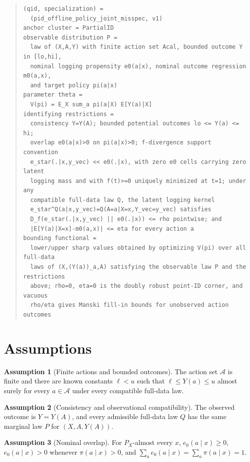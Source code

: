 \documentclass[11pt]{article}
\theoremstyle{definition}
\newtheorem{assumption}{Assumption}
\theoremstyle{plain}
\theoremstyle{remark}
\begin{document}
\begin{quote}\small
\begin{verbatim}
(qid, specialization) =
  (pid_offline_policy_joint_misspec, v1)
anchor cluster = PartialID
observable distribution P =
  law of (X,A,Y) with finite action set Acal, bounded outcome Y in [lo,hi],
  nominal logging propensity e0(a|x), nominal outcome regression m0(a,x),
  and target policy pi(a|x)
parameter theta =
  V(pi) = E_X sum_a pi(a|X) E[Y(a)|X]
identifying restrictions =
  consistency Y=Y(A); bounded potential outcomes lo <= Y(a) <= hi;
  overlap e0(a|x)>0 on pi(a|x)>0; f-divergence support convention
  e_star(.|x,y_vec) << e0(.|x), with zero e0 cells carrying zero latent
  logging mass and with f(t)>=0 uniquely minimized at t=1; under any
  compatible full-data law Q, the latent logging kernel
  e_star^Q(a|x,y_vec)=Q(A=a|X=x,Y_vec=y_vec) satisfies
  D_f(e_star(.|x,y_vec) || e0(.|x)) <= rho pointwise; and
  |E[Y(a)|X=x]-m0(a,x)| <= eta for every action a
bounding functional =
  lower/upper sharp values obtained by optimizing V(pi) over all full-data
  laws of (X,(Y(a))_a,A) satisfying the observable law P and the restrictions
  above; rho=0, eta=0 is the doubly robust point-ID corner, and vacuous
  rho/eta gives Manski fill-in bounds for unobserved action outcomes
\end{verbatim}
\end{quote}

\section{Assumptions}
\begin{assumption}[Finite actions and bounded outcomes]\label{ass:bounded}
The action set $\mathcal{A}$ is finite and there are known constants $\ell<u$ such that $\ell\le Y(a)\le u$ almost surely for every $a\in\mathcal{A}$ under every compatible full-data law.
\end{assumption}

\begin{assumption}[Consistency and observational compatibility]\label{ass:compat}
The observed outcome is $Y=Y(A)$, and every admissible full-data law $Q$ has the same marginal law $P$ for $(X,A,Y(A))$.
\end{assumption}

\begin{assumption}[Nominal overlap]\label{ass:overlap}
For $P_X$-almost every $x$, $e_0(a\mid x)\ge0$, $e_0(a\mid x)>0$ whenever $\pi(a\mid x)>0$, and $\sum_a e_0(a\mid x)=\sum_a\pi(a\mid x)=1$.
\end{assumption}
\end{document}
